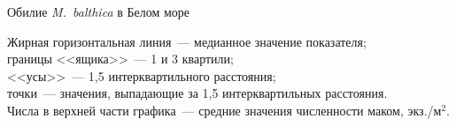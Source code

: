 \documentclass{beamer}
\begin{document}
\begin{frame}{Обилие {\it M.~balthica} в Белом море}
\begin{minipage}[t]{.49\linewidth}
\begin{center}
		\end{center}
	\end{minipage}

\begin{tiny} Жирная горизонтальная линия~--- медианное значение показателя;\\
границы <<ящика>>~--- 1 и 3 квартили;\\ <<усы>>~--- 1,5 интерквартильного расстояния;\\ 
точки~--- значения, выпадающие за 1,5 интерквартильных расстояния.\\ 
Числа в верхней части графика~--- средние значения численности маком, экз./м$^2$.
\end{tiny}

\end{frame}
\end{document}
